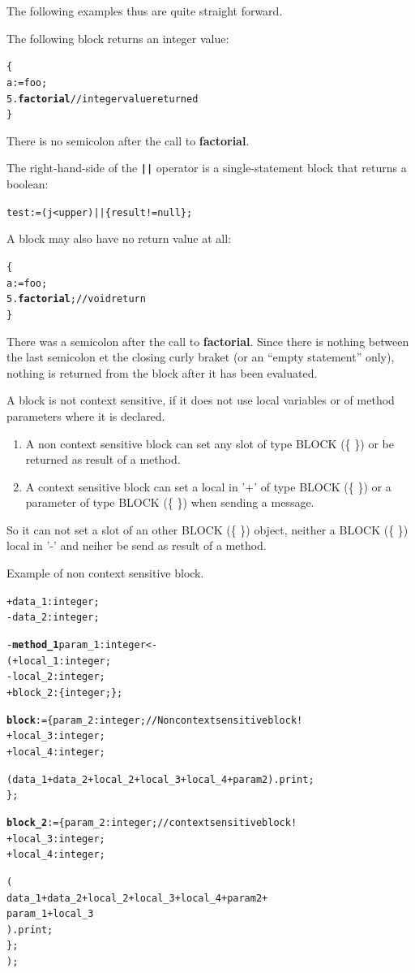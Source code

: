 \documentclass[11pt]{mybook}
\begin{document}
The following examples thus are quite straight forward.

The following block returns an {\sc{}integer} value:
\begin{alltt}
  \{
    a := foo;
    5.{\bf{}factorial}    // integer value returned
  \}
\end{alltt}

There is no semicolon after the call to {\bf{}factorial}.

The right-hand-side of the {\bf\tt ||} operator is a
single-statement block that returns a boolean:
\begin{alltt}
  test := (j < upper) || \{result != {\sc{}null}\};
\end{alltt}

A block may also have no return value at all:
\begin{alltt}
  \{
    a := foo;
    5.{\bf{}factorial};  // void return
  \}
\end{alltt}
There was a semicolon after the call to {\bf{}factorial}.
Since there is nothing between the last semicolon et the
closing curly braket (or an ``empty statement'' only), nothing is
returned from the block after it has been evaluated.

A block is not context sensitive, if it does not use local variables or
of method parameters where it is declared.

\begin{enumerate}
\item A non context sensitive block can set any slot of type BLOCK (\{ \}) or be
returned as result of a method.
\item A context sensitive block can set a local in '+' of type BLOCK (\{ \}) or a
parameter of type BLOCK (\{ \}) when sending a message.
\end{enumerate}
So it can not set a slot of an other BLOCK (\{ \}) object, neither a BLOCK (\{ \}) local in '-'
and neiher be send as result of a method.

Example of non context sensitive block.
\begin{alltt}
  + data\_1:{\sc{}integer};
  - data\_2:{\sc{}integer};

  - {\bf{}method\_1} param\_1:{\sc{}integer} <-
  ( + local\_1:{\sc{}integer};
    - local\_2:{\sc{}integer};
    + block\_2:{\sc{}\{ integer; \}};
		
    {\bf{}block} := \{ param\_2:{\sc{}integer}; // Non context sensitive block !
      + local\_3:{\sc{}integer};
      + local\_4:{\sc{}integer};

      (data\_1 + data\_2 + local\_2 + local\_3 + local\_4 + param2).print;
    \};
    
    {\bf{}block\_2} := \{ param\_2:{\sc{}integer}; // context sensitive block !
      + local\_3:{\sc{}integer};
      + local\_4:{\sc{}integer};

      (
       data\_1 + data\_2 + local\_2 + local\_3 + local\_4 + param2+
       param\_1 + local\_3
      ).print;
    \};
  );
\end{alltt}
\end{document}

